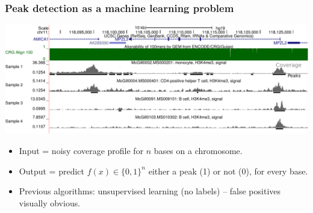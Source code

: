 \documentclass{beamer}
\begin{document}
\begin{frame}
  \frametitle{Peak detection as a machine learning problem}

  \includegraphics[width=\textwidth]{screenshot-ucsc-edited}
  
  \begin{itemize}
  \item Input = noisy coverage profile for $n$ bases
    on a chromosome.
  \item Output = predict $f(x)\in\{0,1\}^{n}$ either a peak (1) or not
    (0), for every base.
  \item Previous algorithms: unsupervised learning (no labels) --
    false positives visually obvious.
  \end{itemize}
 
\end{frame} 

\end{document}
